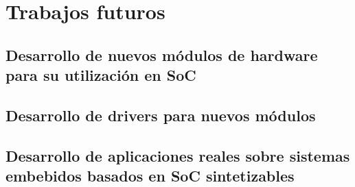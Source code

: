 	\section{Trabajos futuros}
		\subsection{Desarrollo de nuevos módulos de hardware para su utilización en SoC}
		
		\subsection{Desarrollo de drivers para nuevos módulos}
		
		\subsection{Desarrollo de aplicaciones reales sobre sistemas embebidos basados en SoC sintetizables}
		
		
	
	 